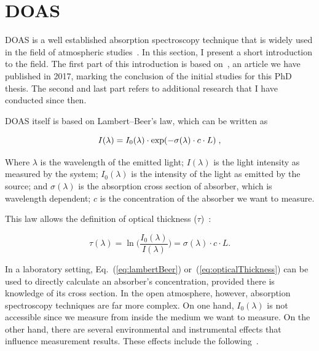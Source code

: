 \section{\gls{DOAS}}%
\label{sec:doas}

\acrlong{DOAS} is a well established absorption spectroscopy technique
that is widely used in the field of atmospheric
studies~\cite{Platt2007}. In this section, I present a short
introduction to the field. The first part of this introduction is based
on~\cite{ValentedeAlmeida2017}, an article we have published in 2017,
marking the conclusion of the initial studies for this PhD thesis. The
second and last part refers to additional research that I have conducted
since then.

\gls{DOAS} itself is based on Lambert--Beer's law, which can be written
as \cite{Platt2007}

\begin{equation}
  \centering
  \label{eq:lambertBeer}
  I(\lambda) = I_0 (\lambda) \cdot \exp(-\sigma(\lambda) \cdot c \cdot L) \;,
\end{equation}

Where $\lambda$ is the wavelength of the emitted light; $I(\lambda)$ is
the light intensity as measured by the system; $I_{0}(\lambda)$ is the
intensity of the light as emitted by the source; and $\sigma(\lambda)$
is the absorption cross section of absorber, which is wavelength
dependent; $c$ is the concentration of the absorber we want to measure.

This law allows the definition of optical thickness
($\tau$)~\cite{Platt2007}:

\begin{equation}
      \label{eq:opticalThickness}
      \tau(\lambda) = \ln \bigg( \frac{I_{0}(\lambda)}{I(\lambda)}\bigg)
      = \sigma(\lambda) \cdot c \cdot L.
\end{equation}

In a laboratory setting, Eq.~(\ref{eq:lambertBeer})
or~(\ref{eq:opticalThickness}) can be used to directly calculate an
absorber's concentration, provided there is knowledge of  its cross
section. In the open atmosphere, however, absorption spectroscopy
techniques are far more complex. On one hand, $I_0(\lambda)$ is not
accessible since we measure from inside the medium we want to measure.
On the other hand, there are several environmental and instrumental
effects that influence measurement results. These effects include the
following~\cite{Platt2007}.


